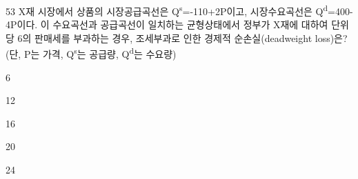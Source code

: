 \begin{question}{53}
X재 시장에서 상품의 시장공급곡선은 Q\textsuperscript{s}=-110+2P이고, 시장수요곡선은 Q\textsuperscript{d}=400-4P이다. 이 수요곡선과 공급곡선이 일치하는 균형상태에서 정부가 X재에 대하여 단위당 6의 판매세를 부과하는 경우, 조세부과로 인한 경제적 순손실(deadweight loss)은? (단, P는 가격, Q\textsuperscript{s}는 공급량, Q\textsuperscript{d}는 수요량)
\begin{choices}
  \item 6
  \item 12
  \item 16
  \item 20
  \item 24
\end{choices}
\end{question}
